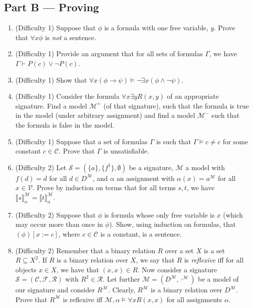 \subsection{Part B --- Proving}
	
\begin{enumerate}[\thesection.1]
  
\item (Difficulty 1) Suppose that $\phi$ is a formula with one free
  variable, $y$. Prove that $\forall x\phi$ is \emph{not} a sentence.
  
\item (Difficulty 1) Provide an argument that for all sets of formulas $\Gamma$,
      we have $\Gamma\vdash P(c)\lor\neg P(c)$.

\item (Difficulty 1) Show that $\forall x(\phi\to \psi)\vDash \neg
  \exists x(\phi\land\neg\psi)$.

  \item (Difficulty 1) Consider the formula $\forall x\exists yR(x,y)$ of an
    appropriate signature. Find a model $\mathcal{M}^+$ (of that
    signature), such that the formula is true in the model (under
    arbitrary assignment) and find a model $\mathcal{M}^-$ such that
    the formula is false in the model.

\item (Difficulty 1) Suppose that a set of formulas $\Gamma$ is
            such that $\Gamma\vDash c\neq c$ for some constant
            $c\in\mathcal{C}$. Prove that $\Gamma$ is unsatisfiable.

\item (Difficulty 2) Let $\mathcal{S}=(\{a\}, \{f^1\},\emptyset)$ be a
  signature, $\mathcal{M}$ a model with $f(d)=d$ for all $d\in
  D^\mathcal{M}$, and $\alpha$ an assignment with
  $\alpha(x)=a^\mathcal{M}$ for all $x\in \mathcal{V}$. Prove by
  induction on terms that for all terms $s,t$, we have $\llbracket s\rrbracket^\mathcal{M}_\alpha=\llbracket t\rrbracket^\mathcal{M}_\alpha$.

\item (Difficulty 2) Suppose that $\phi$ is formula whose only free variable
          is $x$ (which may occur more than once in $\phi$). Show,
          using induction on formulas, that
          $(\phi)[x:=c]$, where $c\in\mathcal{C}$ is a
          constant, is a sentence.

  \item (Difficulty 2) Remember that a binary relation $R$ over a set $X$ is a set
  $R\subseteq X^2$. If $R$ is a binary relation over $X$, we say that $R$ is
  \emph{reflexive} iff for all objects $x\in X$, we have that
  $(x,x)\in R$. Now consider a signature $\mathcal{S}=(\mathcal{C},\mathcal{F},
  \mathcal{R})$ with $R^2\in\mathcal{R}$. Let further
  $\mathcal{M}=(D^\mathcal{M}, \cdot^\mathcal{M})$ be
  a model of our signature and consider $R^\mathcal{M}$. Clearly,
  $R^\mathcal{M}$ is a binary relation over $D^\mathcal{M}$. Prove
  that $R^\mathcal{M}$ is reflexive iff $\mathcal{M},\alpha\vDash
  \forall xR(x,x)$ for all assignments $\alpha$.


\end{enumerate}

